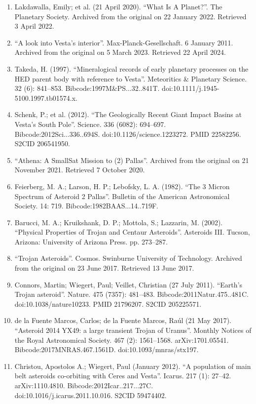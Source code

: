 \begin{enumerate}
\item Lakdawalla, Emily; et al. (21 April 2020). ``What Is A Planet?''. The Planetary Society. Archived from the original on 22 January 2022. Retrieved 3 April 2022.
\item ``A look into Vesta's interior''. Max-Planck-Gesellschaft. 6 January 2011. Archived from the original on 5 March 2023. Retrieved 22 April 2024.
\item Takeda, H. (1997). ``Mineralogical records of early planetary processes on the HED parent body with reference to Vesta''. Meteoritics \& Planetary Science. 32 (6): 841–853. Bibcode:1997M\&PS...32..841T. doi:10.1111/j.1945-5100.1997.tb01574.x.
\item Schenk, P.; et al. (2012). ``The Geologically Recent Giant Impact Basins at Vesta's South Pole''. Science. 336 (6082): 694–697. Bibcode:2012Sci...336..694S. doi:10.1126/science.1223272. PMID 22582256. S2CID 206541950.
\item ``Athena: A SmallSat Mission to (2) Pallas''. Archived from the original on 21 November 2021. Retrieved 7 October 2020.
\item Feierberg, M. A.; Larson, H. P.; Lebofsky, L. A. (1982). ``The 3 Micron Spectrum of Asteroid 2 Pallas''. Bulletin of the American Astronomical Society. 14: 719. Bibcode:1982BAAS...14..719F.
\item Barucci, M. A.; Kruikshank, D. P.; Mottola, S.; Lazzarin, M. (2002). ``Physical Properties of Trojan and Centaur Asteroids''. Asteroids III. Tucson, Arizona: University of Arizona Press. pp. 273–287.
\item ``Trojan Asteroids''. Cosmos. Swinburne University of Technology. Archived from the original on 23 June 2017. Retrieved 13 June 2017.
\item Connors, Martin; Wiegert, Paul; Veillet, Christian (27 July 2011). ``Earth's Trojan asteroid''. Nature. 475 (7357): 481–483. Bibcode:2011Natur.475..481C. doi:10.1038/nature10233. PMID 21796207. S2CID 205225571.
\item de la Fuente Marcos, Carlos; de la Fuente Marcos, Raúl (21 May 2017). ``Asteroid 2014 YX49: a large transient Trojan of Uranus''. Monthly Notices of the Royal Astronomical Society. 467 (2): 1561–1568. arXiv:1701.05541. Bibcode:2017MNRAS.467.1561D. doi:10.1093/mnras/stx197.
\item Christou, Apostolos A.; Wiegert, Paul (January 2012). ``A population of main belt asteroids co-orbiting with Ceres and Vesta''. Icarus. 217 (1): 27–42. arXiv:1110.4810. Bibcode:2012Icar..217...27C. doi:10.1016/j.icarus.2011.10.016. S2CID 59474402.

\end{enumerate}
